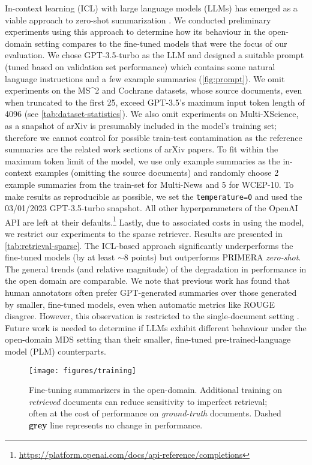 \documentclass[11pt]{article}
\newcommand\mstoo{{MS\^{}2}\xspace}
\begin{document}
In-context learning (ICL) with large language models (LLMs) has emerged as a viable approach to zero-shot summarization \cite{Goyal2022NewsSA}. We conducted preliminary experiments using this approach to determine how its behaviour in the open-domain setting compares to the fine-tuned models that were the focus of our evaluation. We chose GPT-3.5-turbo as the LLM and designed a suitable prompt (tuned based on validation set performance) which contains some natural language instructions and a few example summaries (\autoref{fig:prompt}). We omit experiments on the \mstoo and Cochrane datasets, whose source documents, even when truncated to the first 25, exceed GPT-3.5's maximum input token length of 4096 (see \autoref{tab:dataset-statistics}). We also omit experiments on Multi-XScience, as a snapshot of arXiv is presumably included in the model's training set; therefore we cannot control for possible train-test contamination as the reference summaries are the related work sections of arXiv papers. To fit within the maximum token limit of the model, we use only example summaries as the in-context examples (omitting the source documents) and randomly choose 2 example summaries from the train-set for Multi-News and 5 for WCEP-10. To make results as reproducible as possible, we set the \texttt{temperature=0} and used the 03/01/2023 GPT-3.5-turbo snapshot. All other hyperparameters of the OpenAI API are left at their defaults.\footnote{\url{https://platform.openai.com/docs/api-reference/completions}} Lastly, due to associated costs in using the model, we restrict our experiments to the sparse retriever.  Results are presented in \autoref{tab:retrieval-sparse}. The ICL-based approach significantly underperforms the fine-tuned models (by at least \(\sim\)8 points) but outperforms PRIMERA \textit{zero-shot}. The general trends (and relative magnitude) of the degradation in performance in the open domain are comparable. We note that previous work has found that human annotators often prefer GPT-generated summaries over those generated by smaller, fine-tuned models, even when automatic metrics like ROUGE disagree. However, this observation is restricted to the single-document setting \cite{Goyal2022NewsSA}. Future work is needed to determine if LLMs exhibit different behaviour under the open-domain MDS setting than their smaller, fine-tuned pre-trained-language model (PLM) counterparts.

\begin{figure}[t]
\texttt{[image: figures/training]}
\caption{Fine-tuning summarizers in the open-domain. Additional training on \textit{retrieved} documents can reduce sensitivity to imperfect retrieval; often at the cost of performance on \textit{ground-truth} documents. Dashed \textcolor{MyGrey}{\textbf{grey}} line represents no change in performance.
}
\label{fig:training}
\vspace{-3.5mm}
\end{figure}
\end{document}
